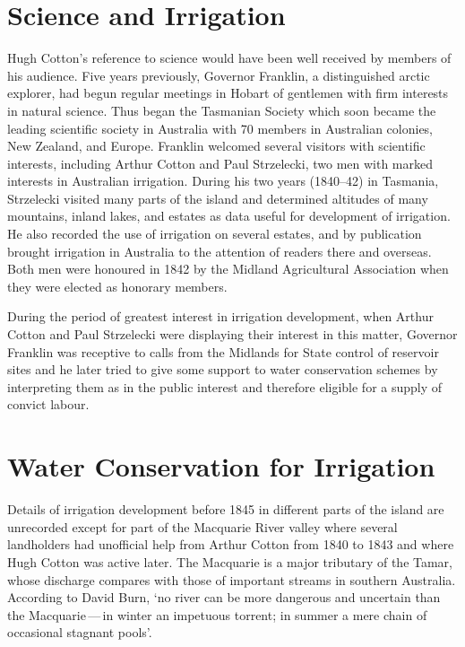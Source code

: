 \section*{Science and Irrigation}

Hugh Cotton's reference to science would have been well received by
members of his audience.  Five years previously, Governor
Franklin, a distinguished arctic explorer,
had begun regular meetings in Hobart of gentlemen with firm interests
in natural science.  Thus began the Tasmanian Society which soon
became the leading scientific society in Australia with 70 members in
Australian colonies, New Zealand, and Europe.  Franklin welcomed
several visitors with scientific interests, including Arthur Cotton
and Paul Strzelecki, two men with marked
interests in Australian irrigation.  During his two years (1840--42)
in Tasmania, Strzelecki visited many parts of the island and
determined altitudes of many mountains, inland lakes, and estates as
data useful for development of irrigation.  He also recorded the use
of irrigation on several estates, and by publication brought
irrigation in Australia to the attention of readers there and
overseas.  Both men were honoured in 1842 by the Midland Agricultural
Association when they were elected as honorary members.

During the period of greatest interest in irrigation development, when
Arthur Cotton and Paul Strzelecki were displaying their interest in
this matter, Governor Franklin was receptive to calls from the
Midlands for State control of reservoir sites and he later tried to
give some support to water conservation schemes by interpreting them
as in the public interest and therefore eligible for a supply of
convict labour.

\section*{Water Conservation for Irrigation}

Details of irrigation development before 1845 in different parts of
the island are unrecorded except for part of the Macquarie River
valley where several landholders had unofficial help from Arthur
Cotton from 1840 to 1843 and where Hugh Cotton was active later.  The
Macquarie is a major tributary of the Tamar, whose
discharge compares with those of important streams in southern
Australia. According to David Burn, `no river can be more dangerous
and uncertain than the Macquarie\,---\,in winter an impetuous torrent;
in summer a mere chain of occasional stagnant
pools'.

